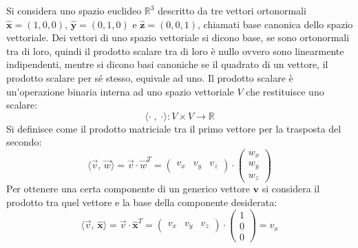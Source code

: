 \documentclass{article}
\numberwithin{equation}{subsection}
\begin{document}
Si considera uno spazio euclideo $\mathbb{R}^3$ descritto da tre vettori ortonormali $\hat{\mathbf{x}}=(1,0,0)$, $\hat{\mathbf{y}}=(0,1,0)$ e $\hat{\mathbf{z}}=(0,0,1)$, chiamati base canonica dello spazio vettoriale. 
Dei vettori di uno spazio vettoriale si dicono base, se sono ortonormali tra di loro, quindi il prodotto scalare tra di loro è nullo ovvero sono linearmente indipendenti, 
mentre si dicono basi canoniche se il quadrato di un vettore, il prodotto scalare per sé stesso, equivale ad uno. 
Il prodotto scalare è un'operazione binaria interna ad uno spazio vettoriale $V$ che restituisce uno scalare:
\begin{equation*}
    \langle \cdot \; , \; \cdot \rangle : V \times V  \rightarrow \mathbb{R}
\end{equation*}
Si definisce come il prodotto matriciale tra il primo vettore per la trasposta del secondo:
\begin{equation*}
    \langle\vec v,\,\vec w\rangle=\vec v\cdot \vec w^T=\begin{pmatrix}
        v_x &v_y&v_z
    \end{pmatrix}\cdot\begin{pmatrix}
        w_x\\ w_y \\ w_z
    \end{pmatrix}
\end{equation*} 
Per ottenere una certa componente di un generico vettore $\mathbf{v}$ si considera il prodotto tra quel vettore e la base della componente desiderata:
\begin{equation*}
    \langle\vec v,\,\hat{\mathbf{x}}\rangle=\vec v\cdot \hat{\mathbf{x}}^T=\begin{pmatrix}
        v_x &v_y&v_z
    \end{pmatrix}\cdot\begin{pmatrix}
        1\\ 0 \\0
    \end{pmatrix}=v_x
\end{equation*} 
\end{document}
